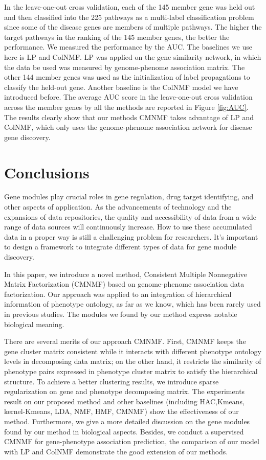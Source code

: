 \documentclass{bmcart}
\begin{document}
 In the leave-one-out cross validation, each of the 145 member gene was held out and then classified into the 225 pathways as a multi-label classification problem since some of the disease genes are
members of multiple pathways. The higher the target pathways in the ranking of the 145 member genes, the better the performance. We measured the performance by the AUC. The baselines we use here is LP and ColNMF. LP was applied on the gene similarity network, in which the data be used was measured by genome-phenome association matrix. The other 144 member genes was used as the initialization of label propagations to classify the held-out gene. Another baseline is the ColNMF model we have introduced before. The average AUC score in the leave-one-out cross validation across the  member genes by all the methods are reported in Figure \ref{fig:AUC}. The results clearly show that our methods CMNMF takes advantage of LP and ColNMF, which only uses the genome-phenome association network for disease gene discovery.

\section*{Conclusions}
Gene modules play crucial roles in gene regulation, drug target identifying, and other aspects of application. As the advancements of technology and the expansions of data repositories, the quality and accessibility of data from a wide range of data sources will continuously increase. How to use these accumulated data in a proper way is still a challenging problem for researchers. It's important to design a framework to integrate different types of data for gene module discovery.

In this paper, we introduce a novel method, Consistent Multiple Nonnegative Matrix Factorization (CMNMF) based on genome-phenome association data factorization. Our approach was applied to an integration of hierarchical information of phenotype ontology, as far as we know, which has been rarely used in previous studies. The modules we found by our method express notable biological meaning.

There are several merits of our approach CMNMF. First, CMNMF keeps the gene cluster matrix consistent while it interacts with different phenotype ontology levels in decomposing data matrix; on the other hand, it restricts the similarity of phenotype pairs expressed in phenotype cluster matrix to satisfy the hierarchical structure. To achieve a better clustering results, we introduce sparse regularization on gene and phenotype decomposing matrix. The experiments result on our proposed method and other baselines (including HAC,Kmeans, kernel-Kmeans, LDA, NMF, HMF, CMNMF) show the effectiveness of our method. Furthermore, we give a more detailed discussion on the gene modules found by our method in biological aspects. Besides, we conduct a supervised CMNMF for gene-phenotype association prediction, the comparison of our model with LP and ColNMF demonstrate the good extension of our methods.
\end{document}
